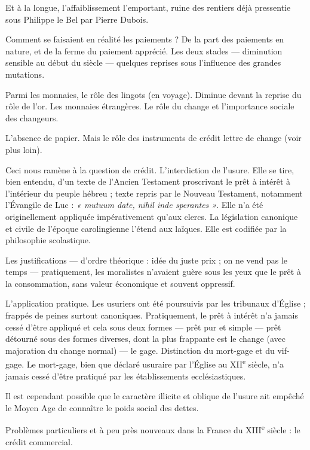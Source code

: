 \documentclass[french,twoside]{book} %
\newcommand{\labelchar}[1]{{\color{rubric}\bf #1}}
\begin{document}
Et à la longue, l’affaiblissement l’emportant, ruine des rentiers déjà pressentie sous Philippe le Bel par Pierre Dubois.\par
\bigbreak
\noindent \labelchar{d)} Comment se faisaient en réalité les paiements ? De la part des paiements en nature, et de la ferme du paiement {\term apprécié}. Les deux stades — diminution sensible au début du siècle — quelques reprises sous l’influence des grandes mutations.\par
Parmi les monnaies, le rôle des lingots (en voyage). Diminue devant la reprise du rôle de l’or. Les monnaies étrangères. Le rôle du change et l’importance sociale des changeurs.\par
L’absence de papier. Mais le rôle des instruments de crédit lettre de change (voir plus loin).\par
\bigbreak
\noindent \labelchar{e)} Ceci nous ramène à la question de crédit. L’interdiction de l’usure. Elle se tire, bien entendu, d’un texte de l’Ancien Testament proscrivant le prêt à intérêt à l’intérieur du peuple hébreu ; texte repris par le Nouveau Testament, notamment l’Évangile de Luc : \emph{« mutuum date, nihil inde sperantes »}. Elle n’a été originellement appliquée impérativement qu’aux clercs. La législation canonique et civile de l’époque carolingienne l’étend aux laïques. Elle est codifiée par la philosophie scolastique.\par
Les justifications — d’ordre théorique : idée du juste prix ; on ne vend pas le temps — pratiquement, les moralistes n’avaient guère sous les yeux que le prêt à la consommation, sans valeur économique et souvent oppressif.\par
L’application pratique. Les usuriers ont été poursuivis par les tribunaux d’Église ; frappés de peines surtout canoniques. Pratiquement, le prêt à intérêt n’a jamais cessé d’être appliqué et cela sous deux formes — prêt pur et simple — prêt détourné sous des formes diverses, dont la plus frappante est le change (avec majoration du change normal) — le gage. Distinction du mort-gage et du vif-gage. Le mort-gage, bien que déclaré usuraire par l’Église au XII\textsuperscript{e} siècle, n’a jamais cessé d’être pratiqué par les établissements ecclésiastiques.\par
Il est cependant possible que le caractère illicite et oblique de l’usure ait empêché le Moyen Age de connaître le poids social des dettes.\par
Problèmes particuliers et à peu près nouveaux dans la France du XIII\textsuperscript{e} siècle : le crédit commercial.\par
\end{document}
